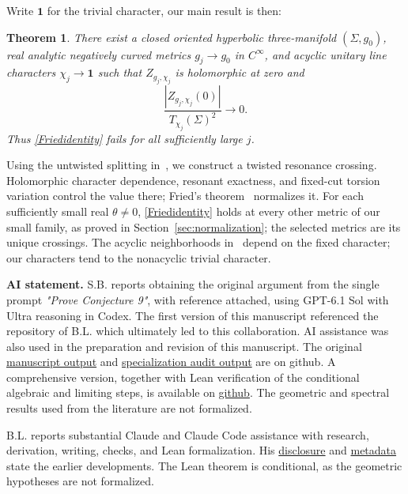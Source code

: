 \documentclass[11pt,letterpaper,reqno]{amsart}
\newtheorem{theorem}{Theorem}[section]
\theoremstyle{remark}
\begin{document}
Write $\mathbf1$ for the trivial character, our main result is then: 
\begin{theorem}\label{mainresult}
There exist a closed oriented hyperbolic three-manifold $(\Sigma,g_0)$,
real analytic negatively curved metrics $g_j\to g_0$ in $C^\infty$,
and acyclic unitary
line characters $\chi_j\to\mathbf1$ such that $Z_{g_j,\chi_j}$ is
holomorphic at zero and
\begin{equation}\label{mainratio}
 \frac{|Z_{g_j,\chi_j}(0)|}{T_{\chi_j}(\Sigma)^2}\longrightarrow0.
\end{equation}
Thus \eqref{Friedidentity} fails for all sufficiently large $j$.
\end{theorem}

Using the untwisted splitting in~\cite{CDDP}, we construct a twisted
resonance crossing. Holomorphic character dependence, resonant exactness, and fixed-cut torsion
variation control the value there; Fried's theorem~\cite{Fried} normalizes it.
For each sufficiently small real $\theta\ne0$, \eqref{Friedidentity}
holds at every other metric of our small family, as proved in
Section~\ref{sec:normalization}; the selected metrics are its unique crossings.
The acyclic neighborhoods in~\cite[Theorem~3]{DGRS} depend on the fixed
character; our characters tend to the nonacyclic trivial character.


\textbf{AI statement.}
S.B. reports obtaining the original argument from the single
prompt \emph{"Prove Conjecture 9"}, with reference \cite{Zw} attached, using
GPT-6.1 Sol with Ultra reasoning in Codex. The first version of this manuscript referenced the repository of B.L. which ultimately led to this collaboration. AI assistance was also used in the preparation and revision of this manuscript. The original
\href{https://github.com/SimonLukas2604/Fried-s-conjecture/blob/0dcb387a3451c6d4d173ccc38b7c8d18c21ac462/original-gpt-outputs/holomorphic_continuity_crossing.tex}{manuscript output}
and
\href{https://github.com/SimonLukas2604/Fried-s-conjecture/blob/0dcb387a3451c6d4d173ccc38b7c8d18c21ac462/original-gpt-outputs/specialization_nilpotent_residue_audit_20261011.tex}{specialization audit output}
are on github. A comprehensive version, together with Lean verification of the
conditional algebraic and limiting steps, is available on
\href{https://github.com/SimonLukas2604/Fried-s-conjecture/tree/0dcb387a3451c6d4d173ccc38b7c8d18c21ac462}{github}.
The geometric and spectral results used from the literature are not formalized.

B.L. reports substantial Claude and Claude Code assistance
with research, derivation, writing, checks, and Lean formalization. His
\href{https://github.com/blawton/fried-conj-lean/blob/610d659ea15af869553f6e3e79c432880d9b0ab0/docs/counterexample_intuitive_view.tex}{disclosure}
and \href{https://github.com/blawton/fried-conj-lean/blob/610d659ea15af869553f6e3e79c432880d9b0ab0/formalization.yaml}{metadata}
state the earlier developments. The Lean theorem is conditional, as the geometric hypotheses are not formalized.
\end{document}
